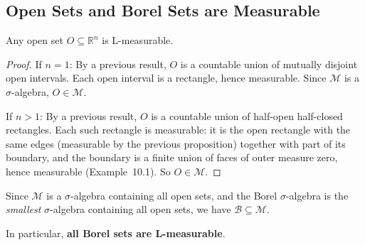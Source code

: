 \documentclass[11pt]{report}
\begin{document}
\subsection{Open Sets and Borel Sets are Measurable}

\begin{thmbox}
Any open set $O \subseteq \mathbb{R}^n$ is L-measurable.
\end{thmbox}

\begin{proof}
If $n = 1$: By a previous result, $O$ is a countable union of mutually disjoint open intervals. Each open interval is a rectangle, hence measurable. Since $\mathcal{M}$ is a $\sigma$-algebra, $O \in \mathcal{M}$.

If $n > 1$: By a previous result, $O$ is a countable union of half-open half-closed rectangles. Each such rectangle is measurable: it is the open rectangle with the same edges (measurable by the previous proposition) together with part of its boundary, and the boundary is a finite union of faces of outer measure zero, hence measurable (Example~10.1). So $O \in \mathcal{M}$.
\end{proof}

\begin{corbox}
Since $\mathcal{M}$ is a $\sigma$-algebra containing all open sets, and the Borel $\sigma$-algebra is the \emph{smallest} $\sigma$-algebra containing all open sets, we have $\mathcal{B} \subseteq \mathcal{M}$.

In particular, \textbf{all Borel sets are L-measurable}.
\end{corbox}
\end{document}
